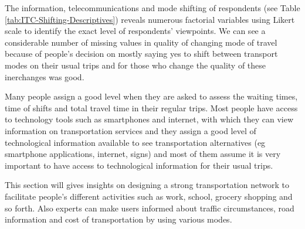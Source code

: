 \documentclass[
11pt, %
oneside, %
english, %
singlespacing, %
]{macthesis} %
\newcommand{\blandscape}{\begin{landscape}}
\newcommand{\elandscape}{\end{landscape}}
\begin{document}
\newpage
\blandscape
\begin{table}

\caption{\label{tab:unnamed-chunk-11}\label{tab:Social-Interaction-Descriptives}Variables regarding social interactions of respondents}
\centering
{}
\end{table}
\elandscape
\newpage

The information, telecommunications and mode shifting of respondents (see Table \ref{tab:ITC-Shifting-Descriptives}) reveals numerous factorial variables using Likert scale to identify the exact level of respondents' viewpoints. We can see a considerable number of missing values in quality of changing mode of travel because of people's decision on mostly saying yes to shift between transport modes on their usual trips and for those who change the quality of these inerchanges was good.

Many people assign a good level when they are asked to assess the waiting times, time of shifts and total travel time in their regular trips. Most people have access to technology tools such as smartphones and internet, with which they can view information on transportation services and they assign a good level of technological information available to see transportation alternatives (eg smartphone applications, internet, signs) and most of them assume it is very important to have access to technological information for their usual trips.

This section will gives insights on designing a strong transportation network to facilitate people's different activities such as work, school, grocery shopping and so forth. Also experts can make users informed about traffic circumstances, road information and cost of transportation by using various modes.
\end{document}
